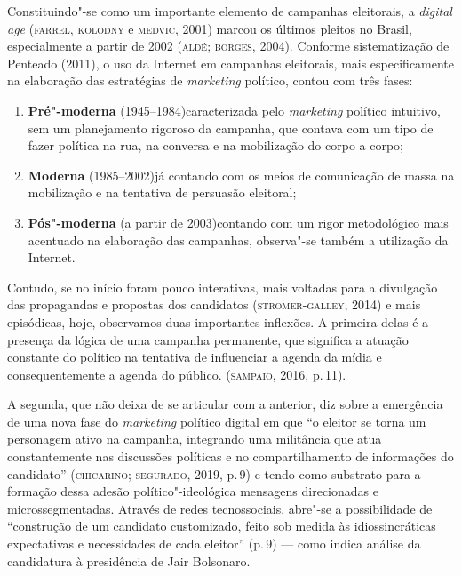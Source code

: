 Constituindo"-se como um importante elemento de campanhas eleitorais, a
\textit{digital age} (\textsc{farrel}, \textsc{kolodny} e \textsc{medvic}, 2001) marcou os últimos
pleitos no Brasil, especialmente a partir de 2002 (\textsc{aldé}; \textsc{borges}, 2004).
Conforme sistematização de Penteado (2011), o uso da Internet em
campanhas eleitorais, mais especificamente na elaboração das estratégias
de \textit{marketing} político, contou com três fases:

\begin{enumerate}
\item \textbf{Pré"-moderna} (1945--1984)\quad caracterizada pelo \textit{marketing} político
intuitivo, sem um planejamento rigoroso da campanha, que contava com um
tipo de fazer política na rua, na conversa e na mobilização do corpo a
corpo;

\item \textbf{Moderna} (1985--2002)\quad já contando com os meios de comunicação de massa
na mobilização e na tentativa de persuasão eleitoral;

\item \textbf{Pós"-moderna} (a partir de 2003)\quad contando com um rigor metodológico
mais acentuado na elaboração das campanhas, observa"-se também a
utilização da Internet.
\end{enumerate}

Contudo, se no início foram pouco interativas, mais voltadas para a
divulgação das propagandas e propostas dos candidatos (\textsc{stromer}-\textsc{galley},
2014) e mais episódicas, hoje, observamos duas importantes inflexões. A
primeira delas é a presença da lógica de uma campanha permanente, que
significa a atuação constante do político na tentativa de influenciar a
agenda da mídia e consequentemente a agenda do público. (\textsc{sampaio}, 2016,
p.\,11).

A segunda, que não deixa de se articular com a anterior, diz sobre a
emergência de uma nova fase do \textit{marketing} político digital em que
``o eleitor se torna um personagem ativo na campanha, integrando uma
militância que atua constantemente nas discussões políticas e no
compartilhamento de informações do candidato'' (\textsc{chicarino}; \textsc{segurado},
2019, p.\,9) e tendo como substrato para a formação dessa adesão
político"-ideológica mensagens direcionadas e microssegmentadas. Através
de redes tecnossociais, abre"-se a possibilidade de ``construção de um
candidato customizado, feito sob medida às idiossincráticas expectativas
e necessidades de cada eleitor'' (p.\,9) --- como indica análise da
candidatura à presidência de Jair Bolsonaro.


